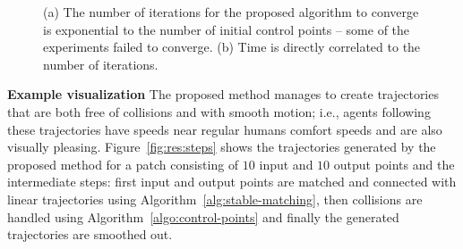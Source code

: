 \begin{figure}[t]
{		(a) The number of iterations for the proposed algorithm to converge is exponential to the number of initial control points -- some of the experiments failed to converge.
		(b) Time is directly correlated to the number of iterations.
}
\label{fig:res:performance}
\end{figure}



\textbf{Example visualization}
The proposed method manages to create trajectories that are both free of collisions and with smooth motion; i.e., agents following these trajectories have speeds near regular humans comfort speeds and are also visually pleasing.
Figure~\ref{fig:res:steps} shows the trajectories generated by the proposed method for a patch consisting of $10$ input and $10$ output points and the intermediate steps: first input and output points are matched and connected with linear trajectories using Algorithm~{\ref{alg:stable-matching}}, then collisions are handled using Algorithm~\ref{algo:control-points} and finally the generated trajectories are smoothed out.

